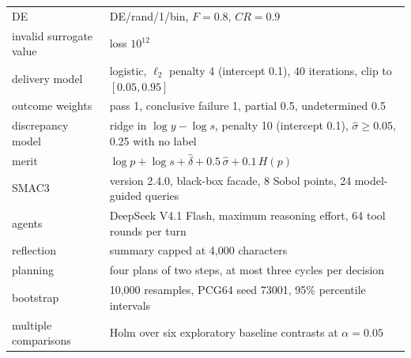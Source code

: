 \begin{table}[H]
\begin{tabular*}{\textwidth}{@{\extracolsep{\fill}}ll}
DE & DE/rand/1/bin, $F = 0.8$, $\mathit{CR} = 0.9$ \\
invalid surrogate value & loss $10^{12}$ \\
delivery model & logistic, $\ell_2$ penalty 4 (intercept 0.1), 40 iterations, clip to $[0.05, 0.95]$ \\
outcome weights & pass 1, conclusive failure 1, partial 0.5, undetermined 0.5 \\
discrepancy model & ridge in $\log y - \log s$, penalty 10 (intercept 0.1), $\hat{\sigma} \ge 0.05$, 0.25 with no label \\
merit & $\log p + \log s + \hat{\delta} + 0.5\, \hat{\sigma} + 0.1\, H(p)$ \\
SMAC3 & version 2.4.0, black-box facade, 8 Sobol points, 24 model-guided queries \\
agents & DeepSeek V4.1 Flash, maximum reasoning effort, 64 tool rounds per turn \\
reflection & summary capped at 4{,}000 characters \\
planning & four plans of two steps, at most three cycles per decision \\
bootstrap & 10{,}000 resamples, PCG64 seed 73001, 95\% percentile intervals \\
multiple comparisons & Holm over six exploratory baseline contrasts at $\alpha = 0.05$ \\
\bottomrule
\end{tabular*}
\end{table}
